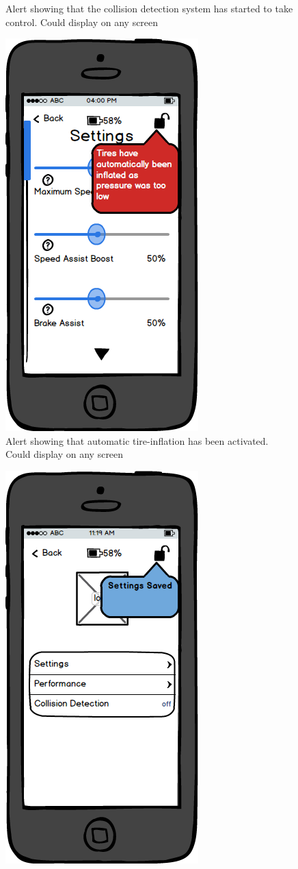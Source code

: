 \documentclass[a4paper]{report}
\begin{document}
{\begin{figure}
\caption{Alert showing that the collision detection system has started to take control. Could display on any screen}
\end{figure}
\clearpage
\begin{figure}
\centering
\includegraphics[scale=0.9]{figures/prototype_1/inflation_settings}
\caption{Alert showing that automatic tire-inflation has been activated. Could display on any screen}
\end{figure}
\clearpage
\begin{figure}
\centering
\includegraphics[scale=0.9]{figures/prototype_1/settings_saved}

\end{figure}}
\end{document}
